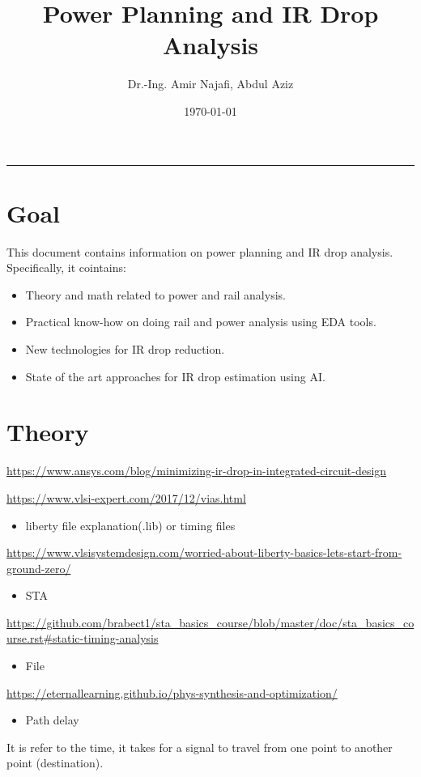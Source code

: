 \documentclass[a4paper]{article}
\author{Dr.-Ing. Amir Najafi, Abdul Aziz}
\date{\today}
\title{Power Planning and IR Drop Analysis}
\begin{document}
\maketitle
\tableofcontents

\noindent\rule{\textwidth}{0.5pt}
\section{Goal}
\label{sec:orgd60c190}
This document contains information on power planning and IR drop analysis. Specifically, it cointains:
\begin{itemize}
\item Theory and math related to power and rail analysis.
\item Practical know-how on doing rail and power analysis using EDA tools.
\item New technologies for IR drop reduction.
\item State of the art approaches for IR drop estimation using AI.
\end{itemize}

\section{Theory}
\label{sec:org80b567a}
\url{https://www.ansys.com/blog/minimizing-ir-drop-in-integrated-circuit-design}

\url{https://www.vlsi-expert.com/2017/12/vias.html}

\begin{itemize}
\item liberty file explanation(.lib) or timing files
\end{itemize}
\url{https://www.vlsisystemdesign.com/worried-about-liberty-basics-lets-start-from-ground-zero/}

\begin{itemize}
\item STA
\end{itemize}
\url{https://github.com/brabect1/sta\_basics\_course/blob/master/doc/sta\_basics\_course.rst\#static-timing-analysis}

\begin{itemize}
\item File
\end{itemize}
\url{https://eternallearning.github.io/phys-synthesis-and-optimization/}


\begin{itemize}
\item Path delay
\end{itemize}
It is refer to the time, it takes for a signal to travel from one point to another point (destination).
\end{document}
